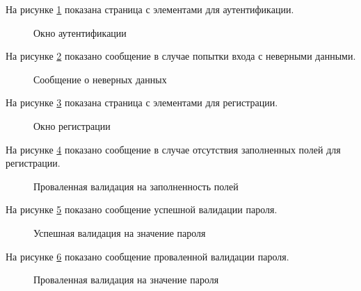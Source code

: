 На рисунке \ref{окно_входа:image} показана страница с элементами для аутентификации.
 \begin{figure}[ht]
	\caption{Окно аутентификации}
	\label{окно_входа:image}
\end{figure}

\newpage

На рисунке \ref{некорректные_данные:image} показано сообщение в случае попытки входа с неверными данными.
\begin{figure}[ht]
	\caption{Сообщение о неверных данных}
	\label{некорректные_данные:image}
\end{figure}

\newpage

На рисунке \ref{регистрация_окно:image} показана страница с элементами для регистрации.
\begin{figure}[ht]
	\caption{Окно регистрации}
	\label{регистрация_окно:image}
\end{figure}

\newpage

На рисунке \ref{регистрация_некорректно:image} показано сообщение в случае отсутствия заполненных полей для регистрации.
\begin{figure}[ht]
	\caption{Проваленная валидация на заполненность полей}
	\label{регистрация_некорректно:image}
\end{figure}

\newpage

На рисунке \ref{пароль_корректно:image} показано сообщение успешной валидации пароля.
\begin{figure}[ht]
	\caption{Успешная валидация на значение пароля}
	\label{пароль_корректно:image}
\end{figure}

\newpage

На рисунке \ref{пароль_некорректно:image} показано сообщение проваленной валидации пароля.
\begin{figure}[ht]
	\caption{Проваленная валидация на значение пароля}
	\label{пароль_некорректно:image}
\end{figure}


